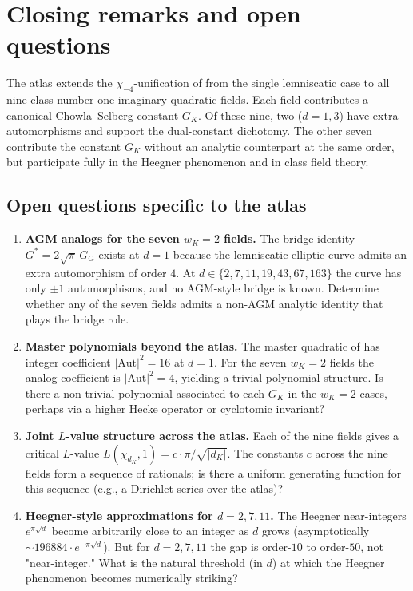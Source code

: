 \documentclass[11pt]{amsart}
\theoremstyle{plain}
\theoremstyle{definition}
\theoremstyle{remark}
\newcommand{\Gs}{G^{*}}
\newcommand{\GG}{G_{\!\scriptscriptstyle\mathrm{G}}}
\newcommand{\GK}{G_{K}}
\newcommand{\Aut}{\mathrm{Aut}}
\begin{document}
\section{Closing remarks and open questions}\label{sec:closing}

The atlas extends the $\chi_{-4}$-unification of \cite{paper-gstar-A}
from the single lemniscatic case to all nine class-number-one imaginary
quadratic fields. Each field contributes a canonical Chowla--Selberg
constant $\GK$. Of these nine, two ($d = 1, 3$) have extra automorphisms
and support the dual-constant dichotomy. The other seven contribute the
constant $\GK$ without an analytic counterpart at the same order, but
participate fully in the Heegner phenomenon and in class field theory.

\subsection{Open questions specific to the atlas}

\begin{enumerate}[label=\textbf{A\arabic*.}, leftmargin=*, itemsep=4pt]

\item \textbf{AGM analogs for the seven $w_K = 2$ fields.} The bridge
identity $\Gs = 2\sqrt{\pi}\,\GG$ exists at $d = 1$ because the lemniscatic
elliptic curve admits an extra automorphism of order $4$. At
$d \in \{2, 7, 11, 19, 43, 67, 163\}$ the curve has only $\pm 1$
automorphisms, and no AGM-style bridge is known. Determine whether any of
the seven fields admits a non-AGM analytic identity that plays the bridge
role.

\item \textbf{Master polynomials beyond the atlas.} The master quadratic
of \cite[\S 8]{paper-gstar-A} has integer coefficient $|\Aut|^{2} = 16$
at $d = 1$. For the seven $w_K = 2$ fields the analog coefficient is
$|\Aut|^{2} = 4$, yielding a trivial polynomial structure. Is there a
non-trivial polynomial associated to each $\GK$ in the $w_K = 2$ cases,
perhaps via a higher Hecke operator or cyclotomic invariant?

\item \textbf{Joint $L$-value structure across the atlas.} Each of the
nine fields gives a critical $L$-value
$L(\chi_{d_K}, 1) = c \cdot \pi / \sqrt{|d_K|}$. The constants $c$ across
the nine fields form a sequence of rationals; is there a uniform
generating function for this sequence (e.g., a Dirichlet series over the
atlas)?

\item \textbf{Heegner-style approximations for $d = 2, 7, 11$.} The
Heegner near-integers $e^{\pi\sqrt{d}}$ become arbitrarily close to an
integer as $d$ grows (asymptotically $\sim 196884 \cdot e^{-\pi\sqrt{d}}$).
But for $d = 2, 7, 11$ the gap is order-$10$ to order-$50$, not "near-integer."
What is the natural threshold (in $d$) at which the Heegner phenomenon
becomes numerically striking?

\end{enumerate}
\end{document}
